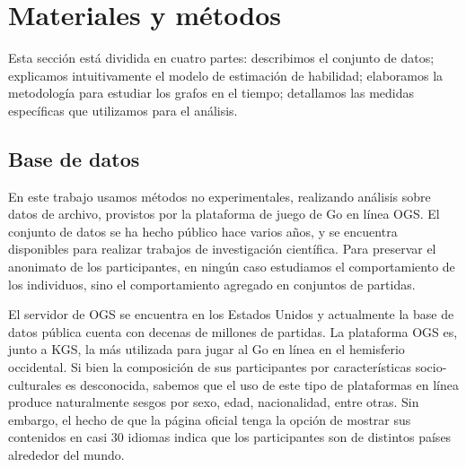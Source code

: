 \documentclass[a4paper,11pt]{book}
\theoremstyle{definition}
\begin{document}
%

\section{Materiales y métodos}

Esta secci\'on est\'a dividida en cuatro partes: describimos el conjunto de datos; explicamos intuitivamente el modelo de estimaci\'on de habilidad; elaboramos la metodolog\'ia para estudiar los grafos en el tiempo; detallamos las medidas espec\'ificas que utilizamos para el an\'alisis.

\subsection{Base de datos}

En este trabajo usamos m\'etodos no experimentales, realizando an\'alisis sobre datos de archivo, provistos por la plataforma de juego de Go en l\'inea OGS.
%
El conjunto de datos se ha hecho p\'ublico hace varios a\~nos, y se encuentra disponibles para realizar trabajos de investigaci\'on cient\'ifica.
%
Para preservar el anonimato de los participantes, en ning\'un caso estudiamos el comportamiento de los individuos, sino el comportamiento agregado en conjuntos de partidas.


El servidor de OGS se encuentra en los Estados Unidos y actualmente la base de datos p\'ublica cuenta con decenas de millones de partidas.
%
La plataforma OGS es, junto a KGS, la m\'as utilizada para jugar al Go en l\'inea en el hemisferio occidental.
%
Si bien la composici\'on de sus participantes por caracter\'isticas socio-culturales es desconocida, sabemos que el uso de este tipo de plataformas en l\'inea produce naturalmente sesgos por sexo, edad, nacionalidad, entre otras.
%
Sin embargo, el hecho de que la p\'agina oficial tenga la opci\'on de mostrar sus contenidos en casi $30$ idiomas indica que los participantes son de distintos pa\'ises alrededor del mundo.

\end{document}
